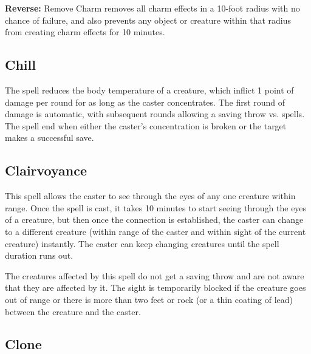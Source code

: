 \begin{multicols*}{2}
\textbf{Reverse:} \hypertarget{spell:Remove Charm}{Remove Charm} removes all charm effects in a 10-foot radius with no chance of failure, and also prevents any object or creature within that radius from creating charm effects for 10 minutes.

\subsection{Chill}\label{spell:Chill}

The spell reduces the body temperature of a creature, which inflict 1 point of damage per round for as long as the caster concentrates. The first round of damage is automatic, with subsequent rounds allowing a saving throw vs. spells. The spell end when either the caster's concentration is broken or the target makes a successful save.

\subsection{Clairvoyance}\label{spell:Clairvoyance}

This spell allows the caster to see through the eyes of any one creature within range. Once the spell is cast, it takes 10 minutes to start seeing through the eyes of a creature, but then once the connection is established, the caster can change to a different creature (within range of the caster and within sight of the current creature) instantly. The caster can keep changing creatures until the spell duration runs out.

The creatures affected by this spell do not get a saving throw and are not aware that they are affected by it. The sight is temporarily blocked if the creature goes out of range or there is more than two feet or rock (or a thin coating of lead) between the creature and the caster.

\subsection{Clone}\label{spell:Clone}
\end{multicols*}
